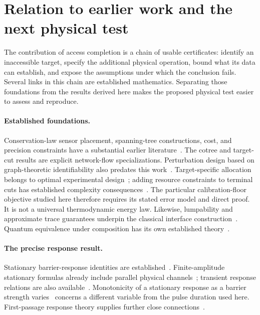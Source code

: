 \section{Relation to earlier work and the next physical test}
\label{sec:completion-positioning}

The contribution of access completion is a chain of usable certificates:
identify an inaccessible target, specify the additional physical operation,
bound what its data can establish, and expose the assumptions under which the
conclusion fails. Several links in this chain are established mathematics.
Separating those foundations from the results derived here makes the proposed
physical test easier to assess and reproduce.

\paragraph{Established foundations.}
Conservation-law sensor placement, spanning-tree constructions, cost, and
precision constraints have a substantial earlier
literature~\cite{ac_bagajewicz,ac_he,ac_xu}. The cotree and target-cut results
are explicit network-flow specializations. Perturbation design based on
graph-theoretic identifiability also predates this work~\cite{ac_gross}.
Target-specific allocation belongs to optimal experimental
design~\cite{ac_elfving,ac_harman}; adding resource constraints to terminal cuts
has established complexity consequences~\cite{ac_aissi}. The particular
calibration-floor objective studied here therefore requires its stated error
model and direct proof. It is not a universal thermodynamic energy law.
Likewise, lumpability and approximate trace guarantees underpin the classical
interface construction~\cite{ac_buchholz,ac_bian}. Quantum equivalence under
composition has its own established theory~\cite{ac_lalire,ac_deng}.

\paragraph{The precise response result.}
Stationary barrier-response identities are
established~\cite{ac_aslyamov_response,ac_aslyamov_static}.
Finite-amplitude stationary formulas already include parallel physical
channels~\cite{ac_bao_nonlinear}; transient response relations are also
available~\cite{ac_zheng}. Monotonicity of a stationary response as a barrier
strength varies~\cite{ac_floyd} concerns a different variable from the pulse
duration used here. First-passage response theory supplies further close
connections~\cite{ac_liang_budget,ac_bao_firstpassage}.

